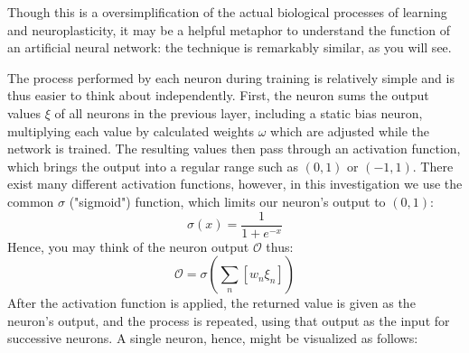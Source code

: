 \documentclass{article}
\begin{document}
Though this is a oversimplification of the actual biological processes of learning and neuroplasticity, it may be a helpful metaphor to understand the function of an artificial neural network: the technique is remarkably similar, as you will see.

The process performed by each neuron during training is relatively simple and is thus easier to think about independently. First, the neuron sums the output values $\xi$ of all neurons in the previous layer, including a static bias neuron, multiplying each value by calculated weights $\omega$ which are adjusted while the network is trained. The resulting values then pass through an activation function, which brings the output into a regular range such as $(0, 1)$ or $(-1, 1)$. There exist many different activation functions, however, in this investigation we use the common $\sigma$ ("sigmoid") function, which limits our neuron's output to $(0, 1)$:
$$\sigma(x)=\frac{1}{1+e^{-x}}$$
Hence, you may think of the neuron output $\mathcal{O}$ thus:
$$\mathcal{O}=\sigma(\sum_n[w_{n}\xi_{n}])$$
After the activation function is applied, the returned value is given as the neuron's output, and the process is repeated, using that output as the input for successive neurons. A single neuron, hence, might be visualized as follows:

\begin{center}
\end{center}
\end{document}
